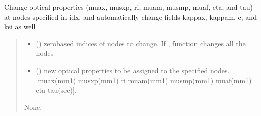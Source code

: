 \documentclass[letterpaper,10pt,english]{sphinxmanual}
\begin{document}
\begin{fulllineitems}
\begin{fulllineitems}
\label{\detokenize{_autosummary/nirfasterff.base.fluor_mesh.fluormesh:nirfasterff.base.fluor_mesh.fluormesh.change_prop}}
\pysigstartsignatures
\pysiglinewithargsret
{}
{\sphinxparamcomma {}}
{}
\pysigstopsignatures
\sphinxAtStartPar
Change optical properties (muax, musxp, ri, muam, musmp, muaf, eta, and tau) at nodes specified in idx, and automatically change fields kappax, kappam, c, and ksi as well
\begin{quote}\begin{description}
\begin{itemize}
\item {} 
\sphinxAtStartPar
{} () \textendash{} zero\sphinxhyphen{}based indices of nodes to change. If , function changes all the nodes

\item {} 
\sphinxAtStartPar
{} () \textendash{} new optical properties to be assigned to the specified nodes. {[}muax(mm\sphinxhyphen{}1) musxp(mm\sphinxhyphen{}1) ri muam(mm\sphinxhyphen{}1) musmp(mm\sphinxhyphen{}1) muaf(mm\sphinxhyphen{}1) eta tau(sec){]}.

\end{itemize}

\sphinxAtStartPar
None.

\end{description}\end{quote}

\end{fulllineitems}



\end{fulllineitems}
\end{document}
